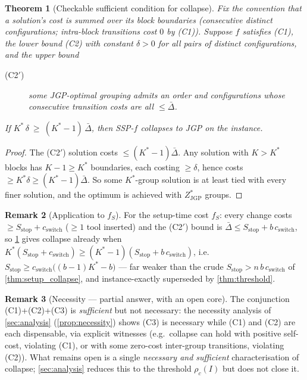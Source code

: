\documentclass[11pt,a4paper]{article}
\theoremstyle{plain}
\newtheorem{theorem}{Theorem}[section]
\theoremstyle{definition}
\newtheorem{remark}[theorem]{Remark}
\newcommand{\Kstar}{K^*}
\newcommand{\ZJGP}{Z_{\mathrm{JGP}}^*}
\begin{document}
\begin{thmbox}
\begin{theorem}[Checkable sufficient condition for collapse]
\label{thm:sufficient_real}
Fix the convention that a solution's cost is summed over its block boundaries
(consecutive distinct configurations; intra-block transitions cost $0$ by (C1)).
Suppose $f$ satisfies (C1), the lower bound (C2) with constant $\delta>0$ for
\emph{all} pairs of distinct configurations, and the upper bound
\begin{description}
\item[(C2$'$)] some JGP-optimal grouping admits an order and configurations whose
  consecutive transition costs are all $\le\bar\Delta$.
\end{description}
If $\Kstar\,\delta\ \ge\ (\Kstar-1)\,\bar\Delta$, then SSP-$f$ collapses to JGP on the
instance.
\end{theorem}
\end{thmbox}
\begin{proofbox}
\begin{proof}
The (C2$'$) solution costs $\le(\Kstar-1)\bar\Delta$. Any solution with $K>\Kstar$
blocks has $K-1\ge\Kstar$ boundaries, each costing $\ge\delta$, hence costs
$\ge\Kstar\delta\ge(\Kstar-1)\bar\Delta$. So some $\Kstar$-group solution is at least
tied with every finer solution, and the optimum is achieved with $\ZJGP$ groups.
\end{proof}
\end{proofbox}

\begin{remark}[Application to $f_S$]
For the setup-time cost $f_S$: every change costs $\ge S_\mathrm{stop}+c_\mathrm{switch}$
($\ge1$ tool inserted) and the (C2$'$) bound is
$\bar\Delta\le S_\mathrm{stop}+b\,c_\mathrm{switch}$, so \cref{thm:sufficient_real} gives
collapse already when
$\Kstar(S_\mathrm{stop}+c_\mathrm{switch})\ge(\Kstar-1)(S_\mathrm{stop}+b\,c_\mathrm{switch})$,
i.e.\ $S_\mathrm{stop}\ge c_\mathrm{switch}\bigl((b-1)\Kstar-b\bigr)$ --- far weaker than
the crude $S_\mathrm{stop}>n\,b\,c_\mathrm{switch}$ of \cref{thm:setup_collapse}, and
instance-exactly superseded by \cref{thm:threshold}.
\end{remark}

\begin{remark}[Necessity — partial answer, with an open core]
The conjunction (C1)+(C2)+(C3) is \emph{sufficient} but not necessary: the necessity
analysis of \cref{sec:analysis} (\cref{prop:necessity}) shows (C3) is necessary while
(C1) and (C2) are each dispensable, via explicit witnesses (e.g.\ collapse can hold with
positive self-cost, violating (C1), or with some zero-cost inter-group transitions,
violating (C2)). What remains open is a single \emph{necessary and sufficient}
characterisation of collapse; \cref{sec:analysis} reduces this to the threshold
$\rho_c(I)$ but does not close it.
\end{remark}
\end{document}
